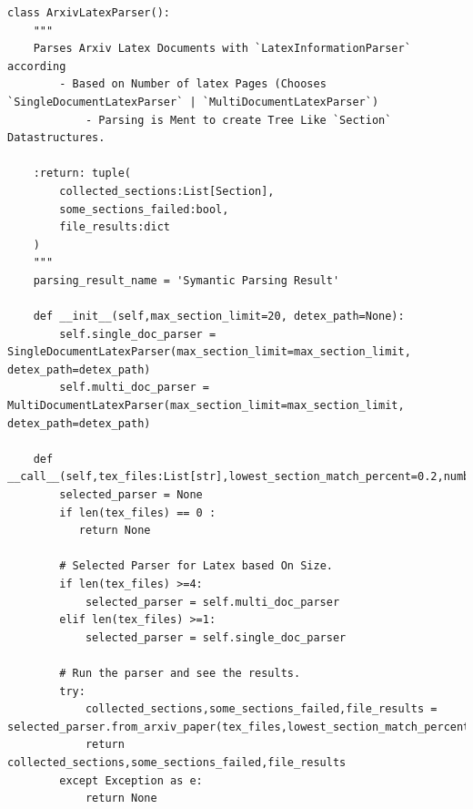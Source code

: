 \begin{lstlisting}
class ArxivLatexParser():
    """
    Parses Arxiv Latex Documents with `LatexInformationParser` according 
        - Based on Number of latex Pages (Chooses `SingleDocumentLatexParser` | `MultiDocumentLatexParser`)
            - Parsing is Ment to create Tree Like `Section` Datastructures.  
    
    :return: tuple(
        collected_sections:List[Section],
        some_sections_failed:bool,
        file_results:dict
    )
    """
    parsing_result_name = 'Symantic Parsing Result'

    def __init__(self,max_section_limit=20, detex_path=None):
        self.single_doc_parser = SingleDocumentLatexParser(max_section_limit=max_section_limit, detex_path=detex_path)
        self.multi_doc_parser = MultiDocumentLatexParser(max_section_limit=max_section_limit, detex_path=detex_path)
    
    def __call__(self,tex_files:List[str],lowest_section_match_percent=0.2,number_to_tries=10):
        selected_parser = None
        if len(tex_files) == 0 : 
           return None
        
        # Selected Parser for Latex based On Size.            
        if len(tex_files) >=4:
            selected_parser = self.multi_doc_parser
        elif len(tex_files) >=1:
            selected_parser = self.single_doc_parser
        
        # Run the parser and see the results. 
        try:
            collected_sections,some_sections_failed,file_results = selected_parser.from_arxiv_paper(tex_files,lowest_section_match_percent=lowest_section_match_percent,number_to_tries=number_to_tries)
            return collected_sections,some_sections_failed,file_results
        except Exception as e:
            return None
        
      

\end{lstlisting}
\pagebreak
